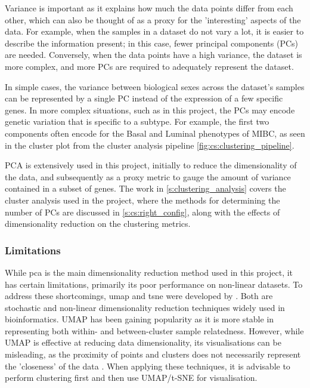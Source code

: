 
Variance is important as it explains how much the data points differ from each other, which can also be thought of as a proxy for the 'interesting' aspects of the data. For example, when the samples in a dataset do not vary a lot, it is easier to describe the information present; in this case, fewer principal components (PCs) are needed. Conversely, when the data points have a high variance, the dataset is more complex, and more PCs are required to adequately represent the dataset.

In simple cases, the variance between biological sexes across the dataset's samples can be represented by a single PC instead of the expression of a few specific genes. In more complex situations, such as in this project, the PCs may encode genetic variation that is specific to a subtype. For example, the first two components often encode for the Basal and Luminal phenotypes of MIBC, as seen in the cluster plot from the cluster analysis pipeline \cref{fig:cs:clustering_pipeline}.

PCA is extensively used in this project, initially to reduce the dimensionality of the data, and subsequently as a proxy metric to gauge the amount of variance contained in a subset of genes. The work in \cref{s:clustering_analysis} covers the cluster analysis used in the project, where the methods for determining the number of PCs are discussed in \cref{s:cs:right_config}, along with the effects of dimensionality reduction on the clustering metrics.


\subsubsection*{Limitations}

While \acrshort{pca} is the main dimensionality reduction method used in this project, it has certain limitations, primarily its poor performance on non-linear datasets. To address these shortcomings, \acrfull{umap} and \acrfull{tsne} were developed by \citep{McInnes2018-dz,Hinton2002-pz} . Both are stochastic and non-linear dimensionality reduction techniques widely used in bioinformatics. UMAP has been gaining popularity as it is more stable in representing both within- and between-cluster sample relatedness. However, while UMAP is effective at reducing data dimensionality, its visualisations can be misleading, as the proximity of points and clusters does not necessarily represent the 'closeness' of the data \citep{Chari2023-et}. When applying these techniques, it is advisable to perform clustering first and then use UMAP/t-SNE for visualisation.

